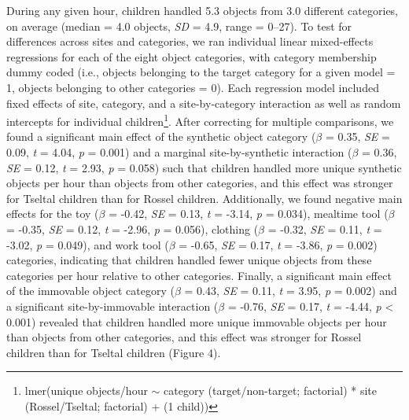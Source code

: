 \documentclass[10pt, letterpaper]{article}
\begin{document}
During any given hour, children handled 5.3 objects from 3.0 different
categories, on average (median = 4.0 objects, \emph{SD} = 4.9, range =
0--27). To test for differences across sites and categories, we ran
individual linear mixed-effects regressions for each of the eight object
categories, with category membership dummy coded (i.e., objects
belonging to the target category for a given model = 1, objects
belonging to other categories = 0). Each regression model included fixed
effects of site, category, and a site-by-category interaction as well as
random intercepts for individual children\footnote{lmer(unique
  objects/hour \({\sim}\) category (target/non-target; factorial) * site
  (Rossel/Tseltal; factorial) + (1 \textbar{} child))}. After correcting
for multiple comparisons, we found a significant main effect of the
synthetic object category (\(\beta\) = 0.35, \emph{SE} = 0.09, \emph{t}
= 4.04, \emph{p} = 0.001) and a marginal site-by-synthetic interaction
(\(\beta\) = 0.36, \emph{SE} = 0.12, \emph{t} = 2.93, \emph{p} = 0.058)
such that children handled more unique synthetic objects per hour than
objects from other categories, and this effect was stronger for Tseltal
children than for Rossel children. Additionally, we found negative main
effects for the toy (\(\beta\) = -0.42, \emph{SE} = 0.13, \emph{t} =
-3.14, \emph{p} = 0.034), mealtime tool (\(\beta\) = -0.35, \emph{SE} =
0.12, \emph{t} = -2.96, \emph{p} = 0.056), clothing (\(\beta\) = -0.32,
\emph{SE} = 0.11, \emph{t} = -3.02, \emph{p} = 0.049), and work tool
(\(\beta\) = -0.65, \emph{SE} = 0.17, \emph{t} = -3.86, \emph{p} =
0.002) categories, indicating that children handled fewer unique objects
from these categories per hour relative to other categories. Finally, a
significant main effect of the immovable object category (\(\beta\) =
0.43, \emph{SE} = 0.11, \emph{t} = 3.95, \emph{p} = 0.002) and a
significant site-by-immovable interaction (\(\beta\) = -0.76, \emph{SE}
= 0.17, \emph{t} = -4.44, \emph{p} \textless{} 0.001) revealed that
children handled more unique immovable objects per hour than objects
from other categories, and this effect was stronger for Rossel children
than for Tseltal children (Figure 4).
\end{document}
